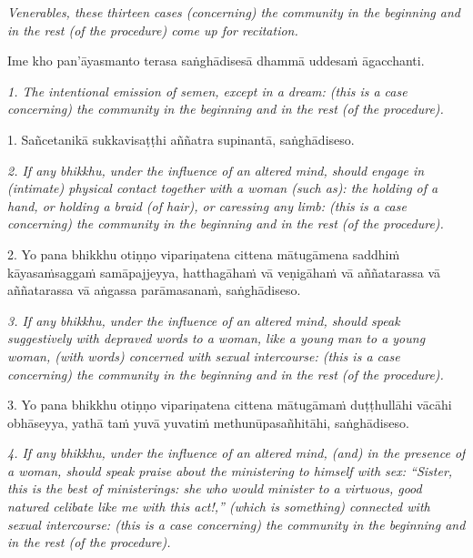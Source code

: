 \documentclass[11pt]{article}
\begin{document}
\begin{paracol}{2}
\begin{column}
{\itshape\footnotesize
Venerables, these thirteen cases (concerning) the community in the beginning and in the rest (of the procedure) come up for recitation.
}
\switchcolumn

\begin{flushleft}
Ime kho pan’āyasmanto terasa saṅghādisesā dhammā uddesaṁ āgacchanti.
\switchcolumn*
\end{flushleft}

{\itshape\footnotesize
1. The intentional emission of semen, except in a dream: (this is a case concerning) the community in the beginning and in the rest (of the procedure).
}
\switchcolumn

\begin{flushleft}
1. Sañcetanikā sukkavisaṭṭhi aññatra supinantā, saṅghādiseso.
\switchcolumn*
\end{flushleft}

{\itshape\footnotesize
2. If any bhikkhu, under the influence of an altered mind, should engage in (intimate) physical contact together with a woman (such as): the holding of a hand, or holding a braid (of hair), or caressing any limb: (this is a case concerning) the community in the beginning and in the rest (of the procedure).
}
\switchcolumn

\begin{flushleft}
2. Yo pana bhikkhu otiṇṇo vipariṇatena cittena mātugāmena saddhiṁ kāyasaṁsaggaṁ samāpajjeyya, hatthagāhaṁ vā veṇigāhaṁ vā aññatarassa vā aññatarassa vā aṅgassa parāmasanaṁ, saṅghādiseso.
\switchcolumn*
\end{flushleft}

{\itshape\footnotesize
3. If any bhikkhu, under the influence of an altered mind, should speak suggestively with depraved words to a woman, like a young man to a young woman, (with words) concerned with sexual intercourse: (this is a case concerning) the community in the beginning and in the rest (of the procedure).
}
\switchcolumn

\begin{flushleft}
3. Yo pana bhikkhu otiṇṇo vipariṇatena cittena mātugāmaṁ duṭṭhullāhi vācāhi obhāseyya, yathā taṁ yuvā yuvatiṁ methunūpasañhitāhi, saṅghādiseso.
\switchcolumn*
\end{flushleft}

{\itshape\footnotesize
4. If any bhikkhu, under the influence of an altered mind, (and) in the presence of a woman, should speak praise about the ministering to himself with sex: “Sister, this is the best of ministerings: she who would minister to a virtuous, good natured celibate like me with this act!,” (which is something) connected with sexual intercourse: (this is a case concerning) the community in the beginning and in the rest (of the procedure).
}
\switchcolumn


\end{column}
\end{paracol}
\end{document}
